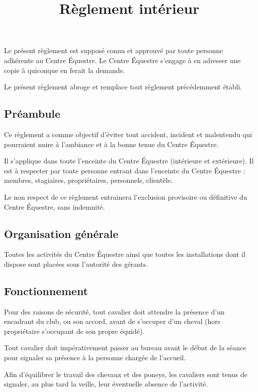 \documentclass[11pt,a4paper]{article}
\title{Règlement intérieur}
\author{}
\date{}
\begin{document}
\maketitle


Le présent règlement est supposé connu et approuvé par toute personne adhérente au Centre Équestre. Le Centre Équestre s'engage à en adresser une copie à quiconque en ferait la demande.

Le présent règlement abroge et remplace tout règlement précédemment établi.

\subsection*{Préambule}

Ce règlement a comme objectif d'éviter tout accident, incident et malentendu qui pourraient nuire à l'ambiance et à la bonne tenue du Centre Équestre.

Il s'applique dans toute l'enceinte du Centre Équestre (intérieure et extérieure). Il est à respecter par toute personne entrant dans l'enceinte du Centre Équestre : membres, stagiaires, propriétaires, personnels, clientèle.

Le non respect de ce règlement entrainera l'exclusion provisoire ou définitive du Centre Équestre, sans indemnité.

\subsection{Organisation générale}
Toutes les activités du Centre Équestre ainsi que toutes les installations dont il dispose sont placées sous l'autorité des gérants.

\subsection{Fonctionnement}
Pour des raisons de sécurité, tout cavalier doit attendre la présence d'un encadrant du club, ou son accord, avant de s'occuper d'un cheval (hors propriétaire s'occupant de son propre équidé).

Tout cavalier doit impérativement passer au bureau avant le début de la séance pour signaler sa présence à la personne chargée de l'accueil.

Afin d'équilibrer le travail des chevaux et des poneys, les cavaliers sont tenus de signaler, au plus tard la veille, leur éventuelle absence de l'activité.
\end{document}
